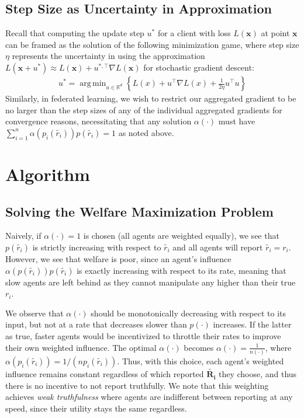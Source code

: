 \documentclass{article}
\DeclareMathOperator*{\argmin}{arg\,min}
\begin{document}
\subsection{Step Size as Uncertainty in Approximation} \label{sec:step-size}
Recall that computing the update step $u^*$ for a client with loss $L(\mathbf{x})$ at point $\mathbf{x}$ can be framed as the solution of the following minimization game, where step size $\eta$ represents the uncertainty in using the approximation $L(\mathbf{x} + u^*) \approx L(\mathbf{x}) + u^{*, \top}\nabla L(\mathbf{x})$ for stochastic gradient descent:
\begin{gather}
    u^* =\argmin_{u \in \mathbb{R}^{d}}\left\{ L(x) + u^{\top} \nabla L(x) + \frac{1}{2\eta} u^{\top} u\right\}
\end{gather}
Similarly, in federated learning, we wish to restrict our aggregated gradient to be no larger than the step sizes of any of the individual aggregated gradients for convergence reasons, necessitating that any solution $\alpha(\cdot)$ must have $\sum_{i=1}^n{\alpha(p_i(\tilde{r_i}))p(\tilde{r_i})} = 1$ as noted above.

\section{Algorithm}

\subsection{Solving the Welfare Maximization Problem}

Naively, if $\alpha(\cdot) = 1$ is chosen (all agents are weighted equally), we see that $p(\tilde{r_i})$ is strictly increasing with respect to $\tilde{r_i}$ and all agents will report $\tilde{r_i} = r_i$. However, we see that welfare is poor, since an agent's influence $\alpha(p(\tilde{r_i}))p(\tilde{r_i})$ is exactly increasing with respect to its rate, meaning that slow agents are left behind as they cannot manipulate any higher than their true $r_i$.

We observe that $\alpha(\cdot)$ should be monotonically decreasing with respect to its input, but not at a rate that decreases slower than $p(\cdot)$ increases. If the latter as true, faster agents would be incentivized to throttle their rates to improve their own weighted influence. The optimal $\alpha(\cdot)$ becomes $\alpha(\cdot) = \frac{1}{n(\cdot)}$, where $\alpha(p_i(\tilde{r_i})) = 1/(np_i(\tilde{r_i}))$. Thus, with this choice, each agent's weighted influence remains constant regardless of which reported $\tilde{\mathbf{R_i}}$ they choose, and thus there is no incentive to not report truthfully. We note that this weighting achieves \emph{weak truthfulness} where agents are indifferent between reporting at any speed, since their utility stays the same regardless.
\end{document}
